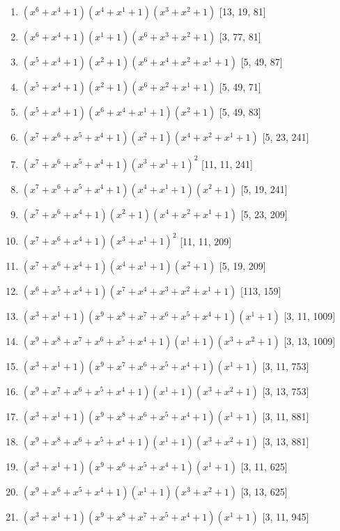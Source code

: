 \documentclass[10pt,twocolumn]{article}
\begin{document}
\begin{enumerate}
\item $(x^{6} + x^{4} + 1)(x^{4} + x^{1} + 1)(x^{3} + x^{2} + 1)$  [13, 19, 81]
\item $(x^{6} + x^{4} + 1)(x^{1} + 1)(x^{6} + x^{3} + x^{2} + 1)$  [3, 77, 81]
\item $(x^{5} + x^{4} + 1)(x^{2} + 1)(x^{6} + x^{4} + x^{2} + x^{1} + 1)$  [5, 49, 87]
\item $(x^{5} + x^{4} + 1)(x^{2} + 1)(x^{6} + x^{2} + x^{1} + 1)$  [5, 49, 71]
\item $(x^{5} + x^{4} + 1)(x^{6} + x^{4} + x^{1} + 1)(x^{2} + 1)$  [5, 49, 83]
\item $(x^{7} + x^{6} + x^{5} + x^{4} + 1)(x^{2} + 1)(x^{4} + x^{2} + x^{1} + 1)$  [5, 23, 241]
\item $(x^{7} + x^{6} + x^{5} + x^{4} + 1)(x^{3} + x^{1} + 1)^{2}$  [11, 11, 241]
\item $(x^{7} + x^{6} + x^{5} + x^{4} + 1)(x^{4} + x^{1} + 1)(x^{2} + 1)$  [5, 19, 241]
\item $(x^{7} + x^{6} + x^{4} + 1)(x^{2} + 1)(x^{4} + x^{2} + x^{1} + 1)$  [5, 23, 209]
\item $(x^{7} + x^{6} + x^{4} + 1)(x^{3} + x^{1} + 1)^{2}$  [11, 11, 209]
\item $(x^{7} + x^{6} + x^{4} + 1)(x^{4} + x^{1} + 1)(x^{2} + 1)$  [5, 19, 209]
\item $(x^{6} + x^{5} + x^{4} + 1)(x^{7} + x^{4} + x^{3} + x^{2} + x^{1} + 1)$  [113, 159]
\item $(x^{3} + x^{1} + 1)(x^{9} + x^{8} + x^{7} + x^{6} + x^{5} + x^{4} + 1)(x^{1} + 1)$  [3, 11, 1009]
\item $(x^{9} + x^{8} + x^{7} + x^{6} + x^{5} + x^{4} + 1)(x^{1} + 1)(x^{3} + x^{2} + 1)$  [3, 13, 1009]
\item $(x^{3} + x^{1} + 1)(x^{9} + x^{7} + x^{6} + x^{5} + x^{4} + 1)(x^{1} + 1)$  [3, 11, 753]
\item $(x^{9} + x^{7} + x^{6} + x^{5} + x^{4} + 1)(x^{1} + 1)(x^{3} + x^{2} + 1)$  [3, 13, 753]
\item $(x^{3} + x^{1} + 1)(x^{9} + x^{8} + x^{6} + x^{5} + x^{4} + 1)(x^{1} + 1)$  [3, 11, 881]
\item $(x^{9} + x^{8} + x^{6} + x^{5} + x^{4} + 1)(x^{1} + 1)(x^{3} + x^{2} + 1)$  [3, 13, 881]
\item $(x^{3} + x^{1} + 1)(x^{9} + x^{6} + x^{5} + x^{4} + 1)(x^{1} + 1)$  [3, 11, 625]
\item $(x^{9} + x^{6} + x^{5} + x^{4} + 1)(x^{1} + 1)(x^{3} + x^{2} + 1)$  [3, 13, 625]
\item $(x^{3} + x^{1} + 1)(x^{9} + x^{8} + x^{7} + x^{5} + x^{4} + 1)(x^{1} + 1)$  [3, 11, 945]

\end{enumerate}
\end{document}
